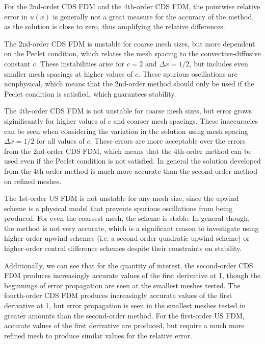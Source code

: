 \documentclass[10pt, reqno]{article}		%
\numberwithin{equation}{section}
\begin{document}
\vspace{20 pt}

For the 2nd-order CDS FDM and the 4th-order CDS FDM, the pointwise relative error in $u(x)$ is generally not a great measure for the accuracy of the method, as the solution is close to zero, thus amplifying the relative differences. 

The 2nd-order CDS FDM is unstable for coarse mesh sizes, but more dependent on the Peclet condition, which relates the mesh spacing to the convective-diffusive constant $c$. These instabilities arise for $c = 2$ and $\Delta x = 1/2$, but includes even smaller mesh spacings at higher values of $c$. These spurious oscillations are nonphysical, which means that the 2nd-order method should only be used if the Peclet condition is satisfied, which guarantees stability. 

The 4th-order CDS FDM is not unstable for coarse mesh sizes, but error grows siginificantly for higher values of $c$ and coarser mesh spacings. These inaccuracies can be seen when considering the variation in the solution using mesh spacing $\Delta x = 1/2$ for all values of $c$. These errors are more acceptable over the errors from the 2nd-order CDS FDM, which means that the 4th-order method can be used even if the Peclet condition is not satisfied. In general the solution developed from the 4th-order method is much more accurate than the second-order method on refined meshes. 

The 1st-order US FDM is not unstable for any mesh size, since the upwind scheme is a physical model that prevents spurious oscillations from being produced. For even the coarsest mesh, the scheme is stable. In general though, the method is not very accurate, which is a significant reason to investigate using higher-order upwind schemes (i.e. a second-order quadratic upwind scheme) or higher-order central difference schemes despite their constraints on stability. 

Additionally, we can see that for the quantity of interest, the second-order CDS FDM produces increasingly accurate values of the first derivative at 1, though the beginnings of error propagation are seen at the smallest meshes tested. The fourth-order CDS FDM produces increasingly accurate values of the first derivative at 1, but error propagation is seen in the smallest meshes tested in greater amounts than the second-order method. For the first-order US FDM, accurate values of the first derivative are produced, but require a much more refined mesh to produce similar values for the relative error.
\end{document}
